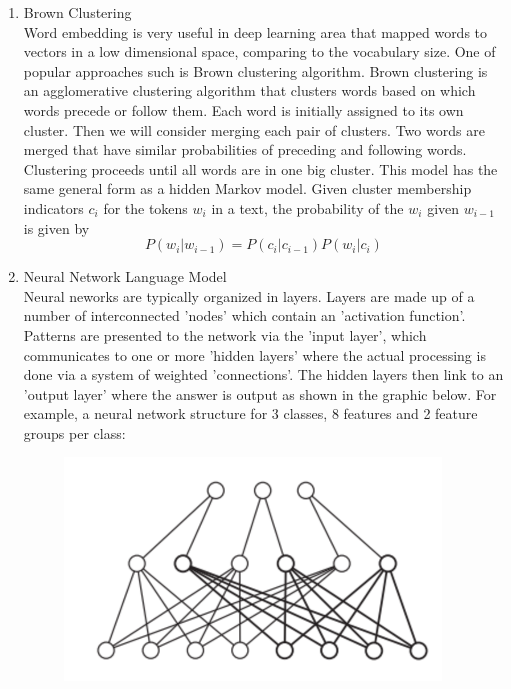 \documentclass [a4paper, 11pt, oneside, final]{article}
\numberwithin{equation}{section}		%
\numberwithin{figure}{section}			%
\numberwithin{table}{section}				%
\begin{document}
\begin{enumerate}
\begin{enumerate}
\item Brown Clustering \\
Word embedding is very useful in deep learning area that mapped words to vectors in a low dimensional space, comparing to the vocabulary size. One of popular approaches such is Brown clustering algorithm. Brown clustering is an agglomerative clustering algorithm that clusters words based on which words precede or follow them. Each word is initially assigned to its own cluster. Then we will consider merging each pair of clusters. Two words are merged that have similar probabilities of preceding and following words. Clustering proceeds until all words are in one big cluster. This model has the same general form as a hidden Markov model. Given cluster membership indicators $c_i$ for the tokens $w_i$ in a text, the probability of the $w_i$ given $w_{i-1}$ is given by\\
$$P(w_i | w_{i-1}) = P(c_i|c_{i-1})P(w_i|c_i)$$
\item Neural Network Language Model\\
Neural neworks are typically organized in layers. Layers are made up of a number of interconnected 'nodes' which contain an 'activation function'. Patterns are presented to the network via the 'input layer', which communicates to one or more 'hidden layers' where the actual processing is done via a system of weighted 'connections'. The hidden layers then link to an 'output layer' where the answer is output as shown in the graphic below. 
For example, a neural network structure for 3 classes, 8 features and 2 feature groups per class:
\begin{figure}[h]
\includegraphics[width = 10cm]{nn}
\end{figure}			        



\end{enumerate}
\end{enumerate}
\end{document}
